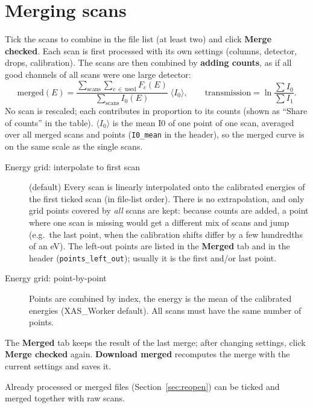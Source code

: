 \documentclass[11pt,a4paper]{article}
\newcommand{\ui}[1]{\textsf{\textbf{#1}}}          %
\begin{document}
\section{Merging scans}
Tick the scans to combine in the file list (at least two) and click
\ui{Merge checked}. Each scan is first processed with its own settings
(columns, detector, drops, calibration). The scans are then combined by
\textbf{adding counts}, as if all good channels of all scans were one large detector:
\[
  \text{merged}(E) = \frac{\sum_\text{scans}\sum_{c\,\in\,\text{used}} F_c(E)}{\sum_\text{scans} I_0(E)}\;\langle I_0\rangle,
  \qquad
  \text{transmission} = \ln\frac{\sum I_0}{\sum I_1}.
\]
No scan is rescaled; each contributes in proportion to its counts (shown as
``Share of counts'' in the table). $\langle I_0\rangle$ is the mean I0 of one point of one scan,
averaged over all merged scans and points (\texttt{I0\_mean} in the header), so the merged
curve is on the same scale as the single scans.

\begin{description}
  \item[Energy grid: interpolate to first scan] (default) Every scan is linearly interpolated onto the
        calibrated energies of the first ticked scan (in file-list order). There is no extrapolation, and
        only grid points covered by \emph{all} scans are kept: because counts are added, a point where one
        scan is missing would get a different mix of scans and jump (e.g.\ the last point, when the
        calibration shifts differ by a few hundredths of an eV). The left-out points are listed in the
        \ui{Merged} tab and in the header (\texttt{points\_left\_out}); usually it is the first and/or last point.
  \item[Energy grid: point-by-point] Points are combined by index, the energy is the mean of the
        calibrated energies (XAS\_Worker default). All scans must have the same number of points.
\end{description}
The \ui{Merged} tab keeps the result of the last merge; after changing settings,
click \ui{Merge checked} again. \ui{Download merged} recomputes the merge with the
current settings and saves it.

Already processed or merged files (Section~\ref{sec:reopen}) can be ticked and merged
together with raw scans.

\end{document}
